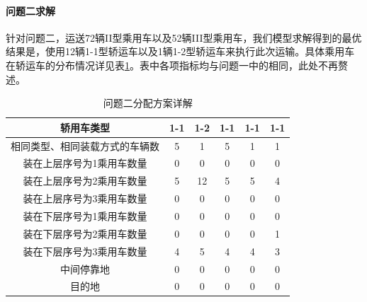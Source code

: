 \documentclass[UTF8，12pt]{ctexart}
\begin{document}
\paragraph{问题二求解}
针对问题二，运送72辆II型乘用车以及52辆III型乘用车，我们模型求解得到的最优结果是，使用12辆1-1型轿运车以及1辆1-2型轿运车来执行此次运输。具体乘用车在轿运车的分布情况详见表\ref{tab:answer2}。表中各项指标均与问题一中的相同，此处不再赘述。
\begin{table}[h!]
\centering
\caption{问题二分配方案详解}\label{tab:answer2}
\begin{tabular}{|c|c|c|c|c|c|}
\hline
轿用车类型 & 1-1 & 1-2 & 1-1 & 1-1 & 1-1\\ \hline 
相同类型、相同装载方式的车辆数 & 5 & 1 & 5 & 1 & 1\\ \hline 
装在上层序号为1乘用车数量 & 0 & 0 & 0 & 0 & 0\\ \hline 
装在上层序号为2乘用车数量 & 5 & 12 & 5 & 5 & 4\\ \hline 
装在上层序号为3乘用车数量 & 0 & 0 & 0 & 0 & 0\\ \hline 
装在下层序号为1乘用车数量 & 0 & 0 & 0 & 0 & 0\\ \hline 
装在下层序号为2乘用车数量 & 0 & 0 & 0 & 0 & 1\\ \hline 
装在下层序号为3乘用车数量 & 4 & 5 & 4 & 4 & 3\\ \hline 
中间停靠地 & 0 & 0 & 0 & 0 & 0\\ \hline 
目的地 & 0 & 0 & 0 & 0 & 0\\ \hline 
\end{tabular}
\end{table}
\end{document}
